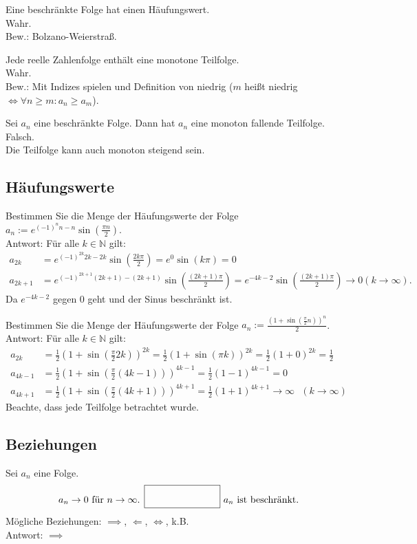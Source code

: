 Eine beschränkte Folge hat einen Häufungswert.\\
Wahr.\\
Bew.: Bolzano-Weierstraß.

Jede reelle Zahlenfolge enthält eine monotone Teilfolge.\\
Wahr.\\
Bew.: Mit Indizes spielen und Definition von niedrig ($m$ heißt niedrig $\iff \forall n \geq m : a_n \geq a_m$).

Sei $a_n$ eine beschränkte Folge.
Dann hat $a_n$ eine monoton fallende Teilfolge.\\
Falsch.\\
Die Teilfolge kann auch monoton steigend sein.

\subsection{Häufungswerte}
Bestimmen Sie die Menge der Häufungswerte der Folge $a_n := e^{(-1)^{n}n-n} \sin\left(\frac{\pi n}{2}\right)$.\\
Antwort:
Für alle $k \in \mathbb{N}$ gilt:
\begin{align*}
  a_{2k} &= e^{(-1)^{2k}2k-2k}\sin\left(\frac{2k\pi}{2}\right) = e^0 \sin(k\pi) = 0\\
  a_{2k+1} &= e^{(-1)^{2k+1}(2k+1)-(2k+1)}\sin\left(\frac{(2k+1)\pi}{2}\right) = e^{-4k-2} \sin\left(\frac{(2k+1)\pi}{2}\right) \to 0 (k \to \infty).
\end{align*}
Da $e^{-4k-2}$ gegen $0$ geht und der Sinus beschränkt ist.

Bestimmen Sie die Menge der Häufungswerte der Folge $a_n := \frac{\left(1+\sin\left(\frac{\pi}{2}n\right)\right)^n}{2}$.\\
Antwort: Für alle $k \in \mathbb{N}$ gilt:
\begin{align*}
  a_{2k} &= \frac{1}{2} \left(1+\sin\left(\frac{\pi}{2}2k\right)\right)^{2k} = \frac{1}{2} \left(1+\sin\left(\pi k\right)\right)^{2k} = \frac{1}{2} (1 + 0)^{2k} = \frac{1}{2}\\
  a_{4k-1} &= \frac{1}{2} \left(1+\sin\left(\frac{\pi}{2}(4k-1)\right)\right)^{4k-1} = \frac{1}{2} (1 - 1)^{4k-1} = 0\\
  a_{4k+1} &= \frac{1}{2} \left(1+\sin\left(\frac{\pi}{2}(4k+1)\right)\right)^{4k+1} = \frac{1}{2} (1 + 1)^{4k+1} \to \infty \text{ } (k \to \infty) 
\end{align*}
Beachte, dass jede Teilfolge betrachtet wurde.

\subsection{Beziehungen}
Sei $a_n$ eine Folge.
\begin{displaymath}
  a_n \to 0 \text{ für } n \to \infty \text{. } \fbox{\rule{1in}{0pt}\rule[-0.5ex]{0pt}{4ex}} \text{ $a_n$ ist beschränkt.}
\end{displaymath}
Mögliche Beziehungen:
$\implies$, $\Leftarrow$, $\iff$, k.B.\\
Antwort: $\implies$